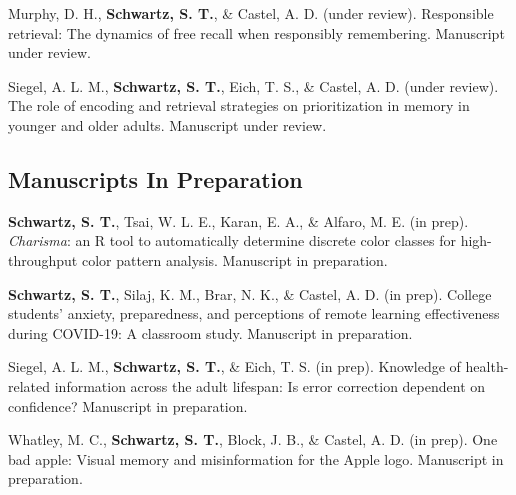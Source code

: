\pubspace

Murphy, D. H., \textbf{Schwartz, S. T.}, \& Castel, A. D. (under review). Responsible retrieval: The dynamics of free recall when responsibly remembering. Manuscript under review.

\pubspace

Siegel, A. L. M., \textbf{Schwartz, S. T.}, Eich, T. S., \& Castel, A. D. (under review). The role of encoding and retrieval strategies on prioritization in memory in younger and older adults. Manuscript under review.

\subsection*{Manuscripts In Preparation}
\textbf{Schwartz, S. T.}, Tsai, W. L. E., Karan, E. A., \& Alfaro, M. E. (in prep). \textit{Charisma}: an R tool to automatically determine discrete color classes for high-throughput color pattern analysis. Manuscript in preparation.

\pubspace

\textbf{Schwartz, S. T.}, Silaj, K. M., Brar, N. K., \& Castel, A. D. (in prep). College students’ anxiety, preparedness, and perceptions of remote learning effectiveness during COVID-19: A classroom study. Manuscript in preparation.

\pubspace

Siegel, A. L. M., \textbf{Schwartz, S. T.}, \& Eich, T. S. (in prep). Knowledge of health-related information across the adult lifespan: Is error correction dependent on confidence? Manuscript in preparation.

\pubspace

Whatley, M. C., \textbf{Schwartz, S. T.}, Block, J. B., \& Castel, A. D. (in prep). One bad apple: Visual memory and misinformation for the Apple logo. Manuscript in preparation.
